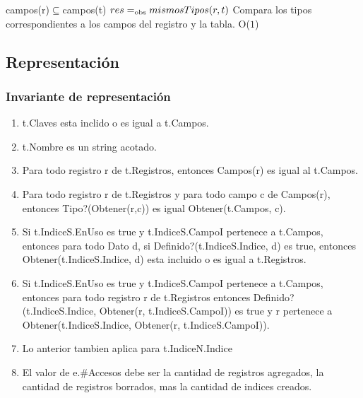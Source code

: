 {campos(r)$\subseteq$campos(t)}%
 {$res =_{\mathrm{obs}} mismosTipos(r,t)$}
 {Compara los tipos correspondientes a los campos del registro y la tabla.}
 {O($1$)}%
 {} 
 
\newpage
\subsection{Representación}

{
{ 
}
}

  
\subsubsection*{Invariante de representación}

\begin{enumerate}
\item	t.Claves esta inclido o es igual a t.Campos.
% 
\item	t.Nombre es un string acotado.
\item	Para todo registro r de t.Registros, entonces Campos(r) es igual al t.Campos.
\item	Para todo registro r de t.Registros y para todo campo c de Campos(r), entonces Tipo?(Obtener(r,c)) es igual Obtener(t.Campos, c).
\item	Si t.IndiceS.EnUso es true y t.IndiceS.CampoI pertenece a t.Campos, entonces para todo Dato d, si Definido?(t.IndiceS.Indice, d) es true, entonces Obtener(t.IndiceS.Indice, d) esta incluido o es igual a t.Registros.
\item	Si t.IndiceS.EnUso es true y t.IndiceS.CampoI pertenece a t.Campos, entonces para todo registro r de t.Registros entonces Definido?(t.IndiceS.Indice, Obtener(r, t.IndiceS.CampoI)) es true y r pertenece a Obtener(t.IndiceS.Indice, Obtener(r, t.IndiceS.CampoI)).
%
\item	Lo anterior tambien aplica para t.IndiceN.Indice
  \item El valor de e.\#Accesos debe ser la cantidad de registros agregados, la cantidad de registros borrados, mas la cantidad de indices creados.
\end{enumerate}

